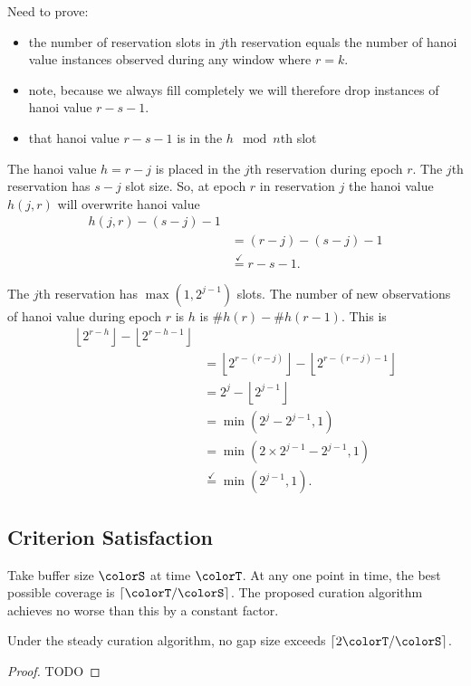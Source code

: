 Need to prove:
\begin{itemize}
\item the number of reservation slots in $j$th reservation equals the number of hanoi value instances observed during any window where $r = k$.
\item note, because we always fill completely we will therefore drop instances of hanoi value $r - s - 1$.
\item that hanoi value $r - s - 1$ is in the $h \mod n$th slot
\end{itemize}

The hanoi value $h = r - j$ is placed in the $j$th reservation during epoch $r$.
The $j$th reservation has $s - j$ slot size.
So, at epoch $r$ in reservation $j$ the hanoi value $h(j, r)$ will overwrite hanoi value
\begin{align*}
h(j, r) - (s - j) - 1 \\
&= (r - j) - (s - j) - 1 \\
&\stackrel{\checkmark}{=} r - s - 1.
\end{align*}

The $j$th reservation has $\max(1, 2^{j - 1})$ slots.
The number of new observations of hanoi value during epoch $r$ is $h$ is $\# h(r) -  \# h(r - 1)$.
This is
\begin{align*}
\left\lfloor 2 ^ {r - h} \right\rfloor - \left\lfloor 2 ^ {r - h - 1} \right\rfloor \\
&= \left\lfloor 2 ^{r - (r - j)} \right\rfloor - \left\lfloor 2 ^ {r - (r - j) - 1} \right\rfloor \\
&= 2^j - \left\lfloor 2 ^ {j - 1} \right\rfloor \\
&= \min(2^j - 2^{j - 1}, 1) \\
&= \min(2 \times 2^{j - 1} - 2^{j - 1}, 1) \\
&\stackrel{\checkmark}{=} \min(2^{j - 1}, 1).
\end{align*}


\subsection{Criterion Satisfaction}

Take buffer size $\colorS$ at time $\colorT$.
At any one point in time, the best possible coverage is $\left\lceil \colorT / \colorS \right\rceil$.
The proposed curation algorithm achieves no worse than this by a constant factor.

\begin{theorem}
\label{thm:steady-gap-size}
Under the steady curation algorithm, no gap size exceeds $\left\lceil 2 \colorT / \colorS \right\rceil$.  %
\end{theorem}
\begin{proof}
TODO
\end{proof}
